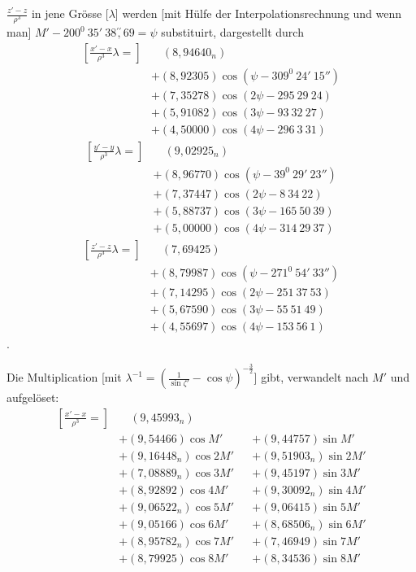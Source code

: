 \(\frac{z'-z}{\rho^3}\) in jene Grösse [\(\lambda\)] werden [mit Hülfe der
Interpolationsrechnung und wenn man] \(M'-200^0\ 35'\ 38\overset{\prime\prime}{,}69=\psi\)
substituirt, dargestellt durch
\[
\begin{aligned}
{\left[\frac{x'-x}{\rho^3}\lambda=\right]}&\quad(8{,}94640_n)\\
&+(8{,}92305)\cos(\psi-309^0\ 24'\ 15'')\\
&+(7{,}35278)\cos(2\psi-295\ 29\ 24)\\
&+(5{,}91082)\cos(3\psi-93\ 32\ 27)\\
&+(4{,}50000)\cos(4\psi-296\ 3\ 31)
\end{aligned}
\]
\[
\begin{aligned}
{\left[\frac{y'-y}{\rho^3}\lambda=\right]}&\quad(9{,}02925_n)\\
&+(8{,}96770)\cos(\psi-39^0\ 29'\ 23'')\\
&+(7{,}37447)\cos(2\psi-8\ 34\ 22)\\
&+(5{,}88737)\cos(3\psi-165\ 50\ 39)\\
&+(5{,}00000)\cos(4\psi-314\ 29\ 37)
\end{aligned}
\]
\[
\begin{aligned}
{\left[\frac{z'-z}{\rho^3}\lambda=\right]}&\quad(7{,}69425)\\
&+(8{,}79987)\cos(\psi-271^0\ 54'\ 33'')\\
&+(7{,}14295)\cos(2\psi-251\ 37\ 53)\\
&+(5{,}67590)\cos(3\psi-55\ 51\ 49)\\
&+(4{,}55697)\cos(4\psi-153\ 56\ 1)
\end{aligned}
\]
.
\par\noindent\hspace*{\parindent}Die Multiplication [mit
\(\lambda^{-1}=\left(\frac1{\sin\zeta'}-\cos\psi\right)^{-\frac32}\)] gibt,
verwandelt nach \(M'\) und aufgelöset:
\[
\begin{aligned}
{\left[\frac{x'-x}{\rho^3}=\right]}&\quad(9{,}45993_n)\\
&+(9{,}54466)\cos M'       &&+(9{,}44757)\sin M'\\
&+(9{,}16448_n)\cos2M'    &&+(9{,}51903_n)\sin2M'\\
&+(7{,}08889_n)\cos3M'    &&+(9{,}45197)\sin3M'\\
&+(8{,}92892)\cos4M'      &&+(9{,}30092_n)\sin4M'\\
&+(9{,}06522_n)\cos5M'    &&+(9{,}06415)\sin5M'\\
&+(9{,}05166)\cos6M'      &&+(8{,}68506_n)\sin6M'\\
&+(8{,}95782_n)\cos7M'    &&+(7{,}46949)\sin7M'\\
&+(8{,}79925)\cos8M'      &&+(8{,}34536)\sin8M'
\end{aligned}
\]
